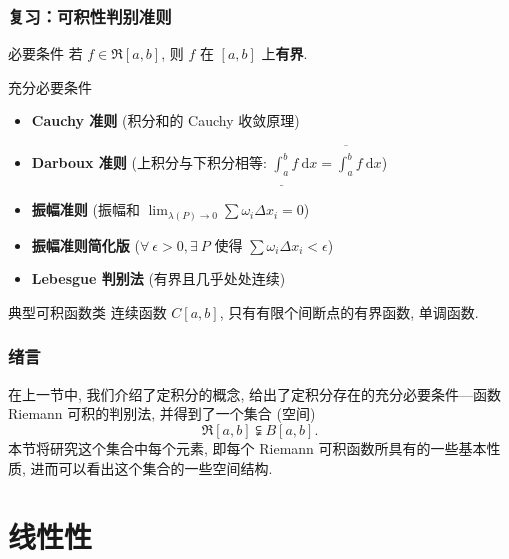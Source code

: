 
\begin{frame}
\frametitle{复习：可积性判别准则}
\begin{block}{必要条件}
若 $f \in \mathfrak{R}[a,b]$, 则 $f$ 在 $[a,b]$ 上\textbf{有界}.
\end{block}

\begin{block}{充分必要条件}
\begin{itemize}
\item \textbf{Cauchy 准则} (积分和的 Cauchy 收敛原理)
\item \textbf{Darboux 准则} (上积分与下积分相等: $\underline{\int_a^b} f ~ \mathrm{d}x = \overline{\int_a^b} f ~ \mathrm{d}x$)
\item \textbf{振幅准则} (振幅和 $\lim_{\lambda(P) \to 0} \sum \omega_i \Delta x_i = 0$)
\item \textbf{振幅准则简化版} ($\forall ~ \epsilon > 0, \exists ~ P$ 使得 $\sum \omega_i \Delta x_i < \epsilon$)
\item \textbf{Lebesgue 判别法} (有界且几乎处处连续)
\end{itemize}
\end{block}

\begin{block}{典型可积函数类}
连续函数 $C[a,b]$, 只有有限个间断点的有界函数, 单调函数.
\end{block}
\end{frame}


\begin{frame}
\frametitle{绪言}

{
\larger[2]
在上一节中, 我们介绍了定积分的概念, 给出了定积分存在的充分必要条件---函数 Riemann 可积的判别法, 并得到了一个集合 (空间)
\[
\mathfrak{R}[a, b] \subsetneqq B[a, b].
\]
本节将研究这个集合中每个元素, 即每个 Riemann 可积函数所具有的一些基本性质, 进而可以看出这个集合的一些空间结构.
}

\end{frame}


\section{线性性}


